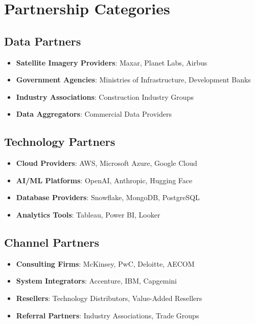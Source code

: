 \documentclass[business]{../templates/infraradar-main}
\begin{document}
\section{Partnership Categories}

\subsection{Data Partners}
\begin{itemize}
    \item \textbf{Satellite Imagery Providers}: Maxar, Planet Labs, Airbus
    \item \textbf{Government Agencies}: Ministries of Infrastructure, Development Banks
    \item \textbf{Industry Associations}: Construction Industry Groups
    \item \textbf{Data Aggregators}: Commercial Data Providers
\end{itemize}

\subsection{Technology Partners}
\begin{itemize}
    \item \textbf{Cloud Providers}: AWS, Microsoft Azure, Google Cloud
    \item \textbf{AI/ML Platforms}: OpenAI, Anthropic, Hugging Face
    \item \textbf{Database Providers}: Snowflake, MongoDB, PostgreSQL
    \item \textbf{Analytics Tools}: Tableau, Power BI, Looker
\end{itemize}

\subsection{Channel Partners}
\begin{itemize}
    \item \textbf{Consulting Firms}: McKinsey, PwC, Deloitte, AECOM
    \item \textbf{System Integrators}: Accenture, IBM, Capgemini
    \item \textbf{Resellers}: Technology Distributors, Value-Added Resellers
    \item \textbf{Referral Partners}: Industry Associations, Trade Groups
\end{itemize}
\end{document}
